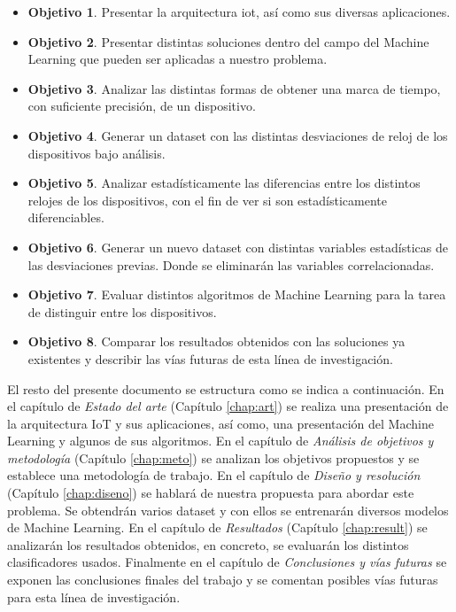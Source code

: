 \begin{itemize}
    \item \textbf{Objetivo 1}. Presentar la arquitectura \acrshort{iot}, así como sus diversas aplicaciones.
    \item \textbf{Objetivo 2}. Presentar distintas soluciones dentro del campo del Machine Learning que pueden ser aplicadas a nuestro problema.
    \item \textbf{Objetivo 3}. Analizar las distintas formas de obtener una marca de tiempo, con suficiente precisión, de un dispositivo.
    \item \textbf{Objetivo 4}. Generar un dataset con las distintas desviaciones de reloj de los dispositivos bajo análisis.
    \item \textbf{Objetivo 5}. Analizar estadísticamente las diferencias entre los distintos relojes de los dispositivos, con el fin de ver si son estadísticamente diferenciables.
    \item \textbf{Objetivo 6}. Generar un nuevo dataset con distintas variables estadísticas de las desviaciones previas. Donde se eliminarán las variables correlacionadas.
    \item \textbf{Objetivo 7}. Evaluar distintos algoritmos de Machine Learning para la tarea de distinguir entre los dispositivos.
    \item \textbf{Objetivo 8}. Comparar los resultados obtenidos con las soluciones ya existentes y describir las vías futuras de esta línea de investigación.
\end{itemize}

El resto del presente documento se estructura como se indica a continuación. En el capítulo de \textit{Estado del arte} (Capítulo \ref{chap:art}) se realiza una presentación de la arquitectura IoT y sus aplicaciones, así como, una presentación del Machine Learning y algunos de sus algoritmos. En el capítulo de \textit{Análisis de objetivos y metodología} (Capítulo \ref{chap:meto}) se analizan los objetivos propuestos y se establece una metodología de trabajo. En el capítulo de \textit{Diseño y resolución} (Capítulo \ref{chap:diseno}) se hablará de nuestra propuesta para abordar este problema. Se obtendrán varios dataset y con ellos se entrenarán diversos modelos de Machine Learning. En el capítulo de \textit{Resultados} (Capítulo \ref{chap:result}) se analizarán los resultados obtenidos, en concreto, se evaluarán los distintos clasificadores usados. Finalmente en el capítulo de \textit{Conclusiones y vías futuras} se exponen las conclusiones finales del trabajo y se comentan posibles vías futuras para esta línea de investigación.

